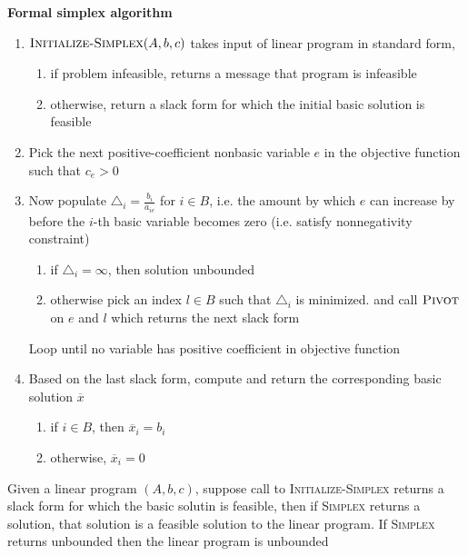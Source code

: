 \documentclass[11pt]{article}
\begin{document}
\begin{defn*}
    \textbf{Formal simplex algorithm}
    \begin{enumerate}
        \item $\textsc{Initialize-Simplex}(A,b,c)$ takes input of linear program in standard form, 
        \begin{enumerate}
            \item if problem infeasible, returns a message that program is infeasible 
            \item otherwise, return a slack form for which the initial basic solution is feasible
        \end{enumerate}
        \item Pick the next positive-coefficient nonbasic variable $e$ in the objective function such that $c_e > 0$
        \item Now populate $\triangle_i = \frac{b_i}{a_{ie}}$ for $i\in B$, i.e. the amount by which $e$ can increase by before the $i$-th basic variable becomes zero (i.e. satisfy nonnegativity constraint)
        \begin{enumerate}
            \item if $\triangle_i =  \infty$, then solution unbounded 
            \item otherwise pick an index $l\in B$ such that $\triangle_i$ is minimized. and call $\textsc{Pivot}$ on $e$ and $l$ which returns the next slack form 
        \end{enumerate}
        Loop until no variable has positive coefficient in objective function
        \item Based on the last slack form, compute and return the corresponding basic solution $\overline{x}$
        \begin{enumerate}
            \item if $i\in B$, then $\overline{x}_i = b_i$ 
            \item otherwise, $\overline{x}_i = 0$
        \end{enumerate}
    \end{enumerate}
\end{defn*}


\begin{lemma*}
    Given a linear program $(A,b,c)$, suppose call to \textsc{Initialize-Simplex} returns a slack form for which the basic solutin is feasible, then if \textsc{Simplex} returns a solution, that solution is a feasible solution to the linear program. If \textsc{Simplex} returns unbounded then the linear program is unbounded
\end{lemma*}
\end{document}
